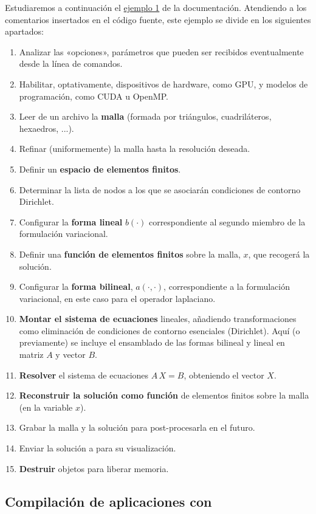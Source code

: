 Estudiaremos a continuación el
\href{https://github.com/mfem/mfem/blob/master/examples/ex1.cpp}{ejemplo
  1} de la documentación. Atendiendo a los comentarios insertados en
el código fuente, este ejemplo se divide en los siguientes apartados:
\begin{enumerate}
\item Analizar las «opciones», parámetros que pueden ser
  recibidos eventualmente desde la línea de comandos.
\item Habilitar, optativamente, dispositivos de hardware, como GPU, y
  modelos de programación, como CUDA u OpenMP.
\item Leer de un archivo la \textbf{malla} (formada por triángulos,
  cuadriláteros, hexaedros, ...).
\item Refinar (uniformemente) la malla hasta la resolución deseada.
\item Definir un \textbf{espacio de elementos finitos}.
\item Determinar la lista de nodos a los que se asociarán condiciones
  de contorno Dirichlet.
\item Configurar la \textbf{forma lineal} $b(\cdot)$ correspondiente al
  segundo miembro de la formulación variacional.
\item Definir una \textbf{función de elementos finitos} sobre la malla, $x$,
  que recogerá la solución.
\item Configurar la \textbf{forma bilineal}, $a(\cdot,\cdot)$, correspondiente
  a la formulación variacional, en este caso para el operador laplaciano.
\item \textbf{Montar el sistema de ecuaciones} lineales, añadiendo
  transformaciones como eliminación de condiciones de contorno
  esenciales (Dirichlet). Aquí (o previamente) se incluye el
  ensamblado de las formas bilineal y lineal en matriz $A$ y vector $B$.
\item \textbf{Resolver} el sistema de ecuaciones $A\, X= B$, obteniendo el vector $X$.
\item \textbf{Reconstruir la solución como función} de elementos finitos sobre la malla (en la variable $x$).
\item Grabar la malla y la solución para post-procesarla en el futuro.
\item Enviar la solución a \glvis para su visualización.
\item \textbf{Destruir} objetos para liberar memoria.
\end{enumerate}

\subsection{Compilación de aplicaciones con \mfem}
\label{sec:comp-de-aplic}

